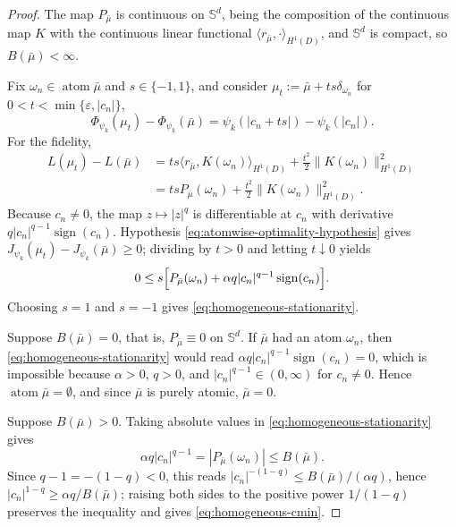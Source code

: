 \documentclass[11pt]{amsart}
\theoremstyle{definition}
\theoremstyle{remark}
\DeclareMathOperator{\atom}{atom}
\DeclareMathOperator{\sign}{sign}
\begin{document}
\begin{proof}
The map $P_{\bar\mu}$ is continuous on $\mathbb S^d$, being the composition
of the continuous map $K$ with the continuous linear functional
$\langle r_{\bar\mu},\cdot\rangle_{H^1(D)}$, and $\mathbb S^d$ is compact, so
$B(\bar\mu)<\infty$.

Fix $\omega_n\in\atom\bar\mu$ and $s\in\{-1,1\}$, and consider
$\mu_t:=\bar\mu+ts\delta_{\omega_n}$ for
$0<t<\min\{\varepsilon,|c_n|\}$,
\begin{equation*}
	\Phi_{\psi_k}(\mu_t)-\Phi_{\psi_k}(\bar\mu)
	=\psi_k(|c_n+ts|)-\psi_k(|c_n|).
\end{equation*}
For the fidelity,
\begin{align*}
	L(\mu_t)-L(\bar\mu)
	&=ts\langle r_{\bar\mu},K(\omega_n)\rangle_{H^1(D)}
	+\frac{t^2}{2}\|K(\omega_n)\|^2_{H^1(D)}\\
	&=tsP_{\bar\mu}(\omega_n)
	+\frac{t^2}{2}\|K(\omega_n)\|^2_{H^1(D)}.
\end{align*}
Because $c_n\ne0$, the map $z\mapsto|z|^q$ is differentiable at $c_n$ with
derivative $q|c_n|^{q-1}\sign(c_n)$. Hypothesis
\eqref{eq:atomwise-optimality-hypothesis} gives
$J_{\psi_k}(\mu_t)-J_{\psi_k}(\bar\mu)\ge0$; dividing by $t>0$ and letting
$t\downarrow0$ yields
\begin{equation*}
	0\le s\Bigl[P_{\bar\mu}(\omega_n)
	+\alpha q|c_n|^{q-1}\sign(c_n)\Bigr].
\end{equation*}
Choosing $s=1$ and $s=-1$ gives \eqref{eq:homogeneous-stationarity}.

Suppose $B(\bar\mu)=0$, that is, $P_{\bar\mu}\equiv0$ on $\mathbb S^d$. If
$\bar\mu$ had an atom $\omega_n$, then \eqref{eq:homogeneous-stationarity}
would read $\alpha q|c_n|^{q-1}\sign(c_n)=0$, which is impossible because
$\alpha>0$, $q>0$, and $|c_n|^{q-1}\in(0,\infty)$ for $c_n\ne0$. Hence
$\atom\bar\mu=\emptyset$, and since $\bar\mu$ is purely atomic, $\bar\mu=0$.

Suppose $B(\bar\mu)>0$. Taking absolute values in
\eqref{eq:homogeneous-stationarity} gives
\begin{equation*}
	\alpha q|c_n|^{q-1}=|P_{\bar\mu}(\omega_n)|\le B(\bar\mu).
\end{equation*}
Since $q-1=-(1-q)<0$, this reads
$|c_n|^{-(1-q)}\le B(\bar\mu)/(\alpha q)$, hence
$|c_n|^{1-q}\ge\alpha q/B(\bar\mu)$; raising both sides to the positive power
$1/(1-q)$ preserves the inequality and gives \eqref{eq:homogeneous-cmin}.
\end{proof}
\end{document}
